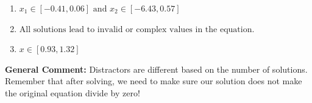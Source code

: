 \documentclass{extbook}[14pt]
\begin{document}
\begin{enumerate}
{\begin{enumerate}[label=\Alph*.]
* $x = -0.215 \text{ and } x = 3.104$, which is the correct option.
\item \( x_1 \in [-0.41, 0.06] \text{ and } x_2 \in [-6.43,0.57] \)


\item \( \text{All solutions lead to invalid or complex values in the equation.} \)


\item \( x \in [0.93,1.32] \)


\end{enumerate}

\textbf{General Comment:} Distractors are different based on the number of solutions. Remember that after solving, we need to make sure our solution does not make the original equation divide by zero!
}
\end{enumerate}
\end{document}
